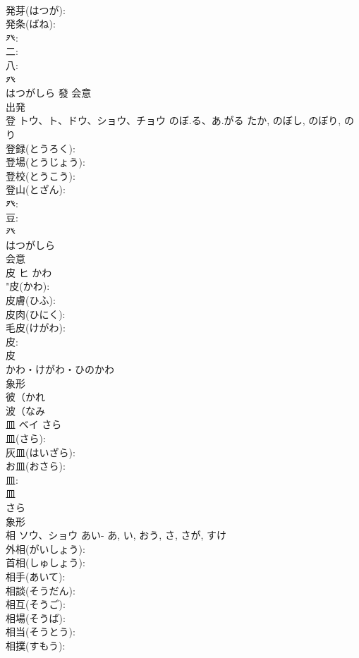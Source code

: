 \documentclass[8pt]{extreport}
\begin{document}
\begin{CJK}{UTF8}{min}
\\	発芽(はつが): 
\\	発条(ばね): 
\\	癶: 
\\	二: 
\\	八: 
\\	癶	
\\	はつがしら	發	会意 
\\	出発　
\\	登	トウ、ト、ドウ、ショウ、チョウ	のぼ.る、あ.がる	たか, のぼし, のぼり, のり	
\\	登録(とうろく): 
\\	登場(とうじょう): 
\\	登校(とうこう): 
\\	登山(とざん): 
\\	癶: 
\\	豆: 
\\	癶	
\\	はつがしら	
\\	会意 
\\	皮	ヒ	かわ		
\\	"皮(かわ): 
\\	皮膚(ひふ): 
\\	皮肉(ひにく): 
\\	毛皮(けがわ): 
\\	皮: 
\\	皮	
\\	かわ・けがわ・ひのかわ	
\\	象形 
\\	彼（かれ 
\\	波（なみ 
\\	皿	ベイ	さら		
\\	皿(さら): 
\\	灰皿(はいざら): 
\\	お皿(おさら): 
\\	皿: 
\\	皿	
\\	さら	
\\	象形 
\\	相	ソウ、ショウ	あい-	あ, い, おう, さ, さが, すけ	
\\	外相(がいしょう): 
\\	首相(しゅしょう): 
\\	相手(あいて): 
\\	相談(そうだん): 
\\	相互(そうご): 
\\	相場(そうば): 
\\	相当(そうとう): 
\\	相撲(すもう): 

\end{CJK}
\end{document}
